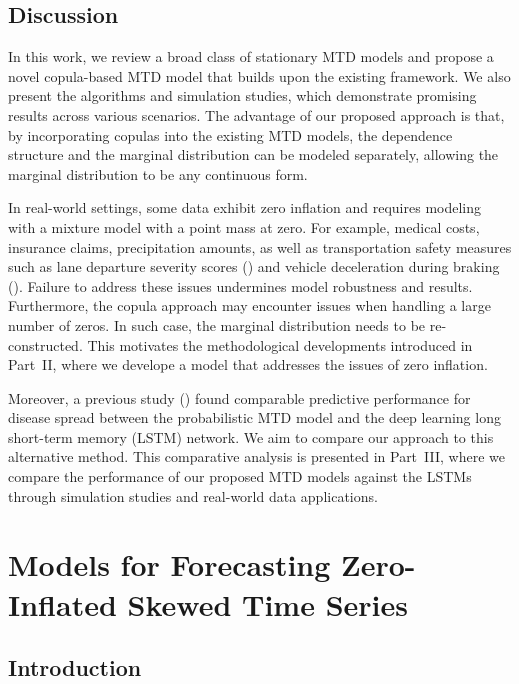 \documentclass[
  letterpaper,
  double,
  12pt,
  1.0in]{beavtex}
\begin{document}
\chapter{Discussion}\label{sec-ch1-discussion}

In this work, we review a broad class of stationary MTD models and
propose a novel copula-based MTD model that builds upon the existing
framework. We also present the algorithms and simulation studies, which
demonstrate promising results across various scenarios. The advantage of
our proposed approach is that, by incorporating copulas into the
existing MTD models, the dependence structure and the marginal
distribution can be modeled separately, allowing the marginal
distribution to be any continuous form.

In real-world settings, some data exhibit zero inflation and requires
modeling with a mixture model with a point mass at zero. For example,
medical costs, insurance claims, precipitation amounts, as well as
transportation safety measures such as lane departure severity scores
() and vehicle deceleration
during braking (). Failure to
address these issues undermines model robustness and results.
Furthermore, the copula approach may encounter issues when handling a
large number of zeros. In such case, the marginal distribution needs to
be re-constructed. This motivates the methodological developments
introduced in Part~II, where we develope a model that addresses the
issues of zero inflation.

Moreover, a previous study ()
found comparable predictive performance for disease spread between the
probabilistic MTD model and the deep learning long short-term memory
(LSTM) network. We aim to compare our approach to this alternative
method. This comparative analysis is presented in Part~III, where we
compare the performance of our proposed MTD models against the LSTMs
through simulation studies and real-world data applications.

\part{Models for Forecasting Zero-Inflated Skewed Time Series}

\chapter{Introduction}\label{sec-ch2-intro}
\end{document}
